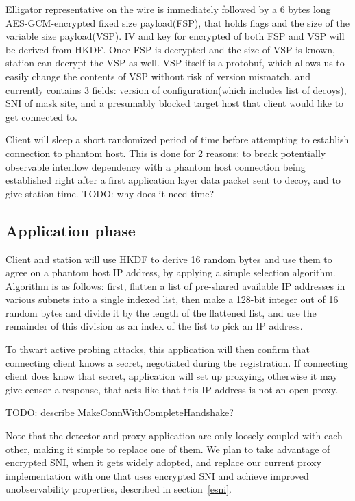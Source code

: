 \documentclass[letterpaper,twocolumn,10pt]{article}
\begin{document}
Elligator representative on the wire is immediately followed by a 6 bytes long AES-GCM-encrypted
fixed size payload(FSP), that holds flags and the size of the variable size payload(VSP).
IV and key for encrypted of both FSP and VSP will be derived from HKDF.
Once FSP is decrypted and the size of VSP is known, station can decrypt the VSP as well.
VSP itself is a protobuf, which allows us to easily change the contents of VSP without risk of version mismatch, and currently contains 3 fields: version of configuration(which includes list of decoys), SNI of mask site, and a presumably blocked target host that client would like to get connected to.

Client will sleep a short randomized period of time before attempting to establish connection to phantom host.
This is done for 2 reasons: to break potentially observable interflow dependency with a phantom host connection being established right after a first application layer data packet sent to decoy,
and to give station time.
TODO: why does it need time?

\subsection{Application phase}
Client and station will use HKDF to derive 16 random bytes and use them to
agree on a phantom host IP address, by applying a simple selection algorithm.
Algorithm is as follows: first, flatten a list of pre-shared available IP
addresses in various subnets into a single indexed list, then make a 128-bit
integer out of 16 random bytes and divide it by the length
of the flattened list, and use the remainder of this division as an index
of the list to pick an IP address.

To thwart active probing attacks, this application will then confirm
that connecting client knows a secret, negotiated during the registration.
If connecting client does know that secret, application will set up proxying,
otherwise it may give censor a response, that acts like that this IP address
is not an open proxy.

TODO: describe MakeConnWithCompleteHandshake?

Note that the detector and proxy application are only loosely coupled with each other,
making it simple to replace one of them.
We plan to take advantage of encrypted SNI, when it gets widely adopted,
and replace our current proxy implementation with one that uses encrypted SNI
and achieve improved unobservability properties, described in section~\ref{esni}.
\end{document}
